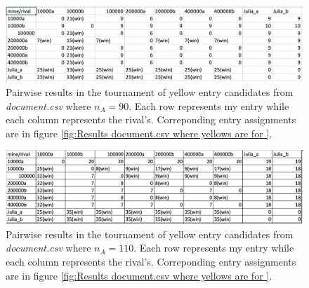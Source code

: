 \documentclass[aos,preprint]{imsart}  %
\numberwithin{table}{section} %
\theoremstyle{plain}
\theoremstyle{plain}
\theoremstyle{TheoremNum}
\newcommand{\1}{{\bf 1}}
\newcommand{\0}{{\vec{\mathbf{0}}}}
\numberwithin{equation}{section}
\begin{document}
\begin{figure}[ht]
	\caption{Pairwise results in the tournament of yellow entry candidates from \textit{document.csv} where $n_A=90$. Each row represents my entry while each column represents the rival's. Correponding entry assignments are in figure \ref{fig:Results document.csv where yellows are for }.}
	\label{fig:output table 90}
	\begin{center}
		\includegraphics[width =\textwidth]{output_table_90.png}
	\end{center}
	
\end{figure}

\begin{figure}[ht]
	\caption{Pairwise results in the tournament of yellow entry candidates from \textit{document.csv} where $n_A=110$. Each row represents my entry while each column represents the rival's. Correponding entry assignments are in figure \ref{fig:Results document.csv where yellows are for }.}
	\label{fig:output table 110}
	\begin{center}
		\includegraphics[width =\textwidth]{output_table_110.png}
	\end{center}
	
\end{figure}


%


\end{document}
